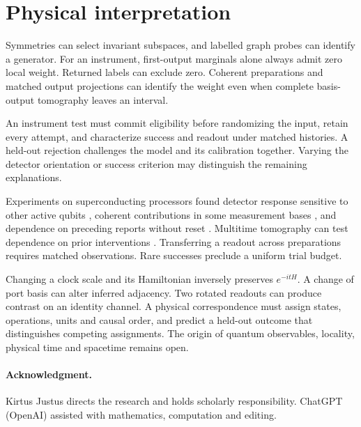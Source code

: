 \documentclass[11pt,letterpaper]{article}
\begin{document}
\section{Physical interpretation}\label{sec:discussion}

Symmetries can select invariant subspaces, and labelled graph probes can identify a generator. For an instrument, first-output marginals alone always admit zero local weight. Returned labels can exclude zero. Coherent preparations and matched output projections can identify the weight even when complete basis-output tomography leaves an interval.

An instrument test must commit eligibility before randomizing the input, retain every attempt, and characterize success and readout under matched histories. A held-out rejection challenges the model and its calibration together. Varying the detector orientation or success criterion may distinguish the remaining explanations.

Experiments on superconducting processors found detector response sensitive to other active qubits \cite{chen}, coherent contributions in some measurement bases \cite{aasen}, and dependence on preceding reports without reset \cite{werninghaus}. Multitime tomography can test dependence on prior interventions \cite{white}. Transferring a readout across preparations requires matched observations. Rare successes preclude a uniform trial budget.

Changing a clock scale and its Hamiltonian inversely preserves $e^{-itH}$. A change of port basis can alter inferred adjacency. Two rotated readouts can produce contrast on an identity channel. A physical correspondence must assign states, operations, units and causal order, and predict a held-out outcome that distinguishes competing assignments. The origin of quantum observables, locality, physical time and spacetime remains open.

\paragraph{Acknowledgment.} Kirtus Justus directs the research and holds scholarly responsibility. ChatGPT (OpenAI) assisted with mathematics, computation and editing.

\clearpage
\end{document}
